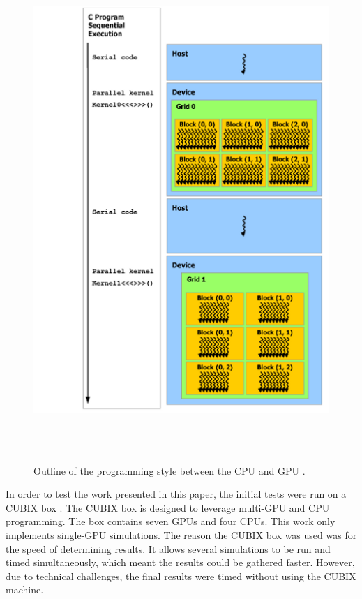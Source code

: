 \begin{figure}%
\centering
\includegraphics[height=7.5in]{figures/background/cuda_arch.png}
\caption{Outline of the programming style between the CPU and GPU \cite{cuda}.}
\label{fig:cuda_arch}
\end{figure}

In order to test the work presented in this paper, the initial tests were run on a CUBIX box \cite{cubix}. The CUBIX box is designed to leverage multi-GPU and CPU programming. The box contains seven GPUs and four CPUs. This work only implements single-GPU simulations. The reason the CUBIX box was used was for the speed of determining results. It allows several simulations to be run and timed simultaneously, which meant the results could be gathered faster. However, due to technical challenges, the final results were timed without using the CUBIX machine.

